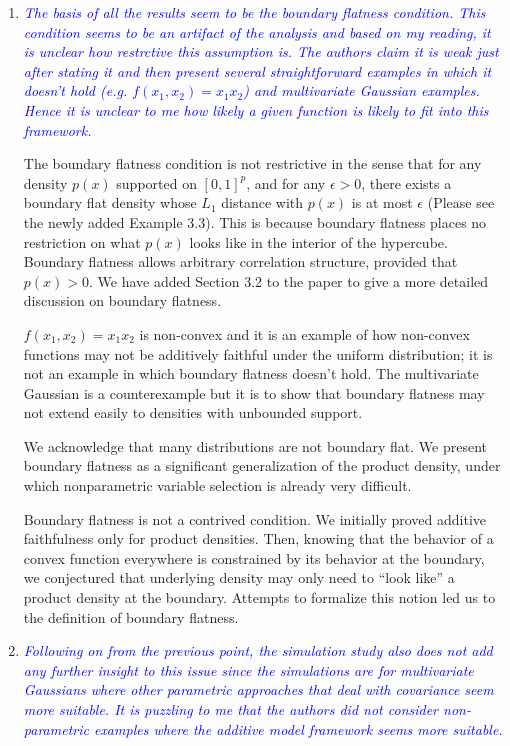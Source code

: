 \documentclass[pdftex,12pt]{article}
\def\rc#1{{\it\textcolor{blue}{#1}}\smallskip}
\begin{document}
\begin{enumerate}
\item \rc{The basis of all the results seem to be the boundary flatness
condition. This condition seems to be an artifact of the analysis and
based on my reading, it is unclear how restrctive this assumption
is. The authors claim it is weak just after stating it and then
present several straightforward examples in which it doesn't hold
(e.g. $f(x_1,x_2)=x_1 x_2$) and multivariate Gaussian examples. Hence it is unclear to me how
likely a given function is likely to fit into this framework.}

The boundary flatness condition is not restrictive in the sense that for any density $p(x)$ supported on $[0,1]^p$, and for any $\epsilon > 0$, there exists a boundary flat density whose $L_1$ distance with $p(x)$ is at most $\epsilon$ (Please see the newly added Example 3.3). This is because boundary flatness places no restriction on what $p(x)$ looks like in the interior of the hypercube. Boundary flatness allows arbitrary correlation structure, provided that $p(x) > 0$. We have added Section 3.2 to the paper to give a more detailed discussion on boundary flatness. 

$f(x_1,x_2) = x_1 x_2$ is non-convex and it is an example of how non-convex functions may not be additively faithful under the uniform distribution; it is not an example in which boundary flatness doesn't hold. The multivariate Gaussian is a counterexample but it is to show that boundary flatness may not extend easily to densities with unbounded support. 

We acknowledge that many distributions are not boundary flat. We present boundary flatness as a significant generalization of the product density, under which nonparametric variable selection is already very difficult.

Boundary flatness is not a contrived condition. We initially proved additive faithfulness only for product densities. Then, knowing that the behavior of a convex function everywhere is constrained by its behavior at the boundary, we conjectured that underlying density may only need to ``look like'' a product density at the boundary. Attempts to formalize this notion led us to the definition of boundary flatness.

\item \rc{Following on from the previous point, the simulation study also does
not add any further insight to this issue since the simulations are
for multivariate Gaussians where other parametric approaches that deal
with covariance seem more suitable. It is puzzling to me that the
authors did not consider non-parametric examples where the additive
model framework seems more suitable.}


\end{enumerate}
\end{document}
